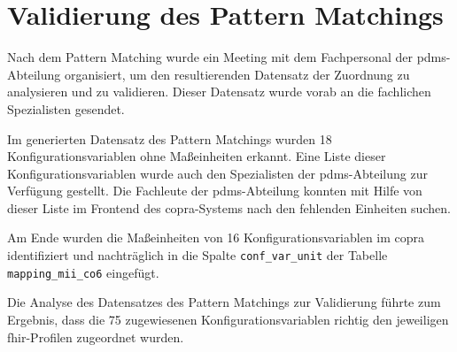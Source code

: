 \section{Validierung des Pattern Matchings } \label{sec:validmethode}

Nach dem Pattern Matching wurde ein Meeting mit dem Fachpersonal der \ac{pdms}-Abteilung organisiert, um den resultierenden Datensatz der Zuordnung zu analysieren und zu validieren. Dieser Datensatz wurde vorab an die fachlichen Spezialisten gesendet.

Im generierten Datensatz des Pattern Matchings wurden 18 Konfigurationsvariablen ohne Maßeinheiten erkannt. Eine Liste dieser Konfigurationsvariablen wurde auch den Spezialisten der \ac{pdms}-Abteilung zur Verfügung gestellt. Die Fachleute der \ac{pdms}-Abteilung konnten mit Hilfe von dieser Liste im Frontend des \ac{copra}-Systems nach den fehlenden Einheiten suchen.

Am Ende wurden die Maßeinheiten von 16 Konfigurationsvariablen im \ac{copra} identifiziert und nachträglich in die Spalte \texttt{conf\_var\_unit} der Tabelle \texttt{mapping\_mii\_co6} eingefügt.

Die Analyse des Datensatzes des Pattern Matchings zur Validierung führte zum Ergebnis, dass die 75 zugewiesenen Konfigurationsvariablen richtig den jeweiligen \ac{fhir}-Profilen zugeordnet wurden.